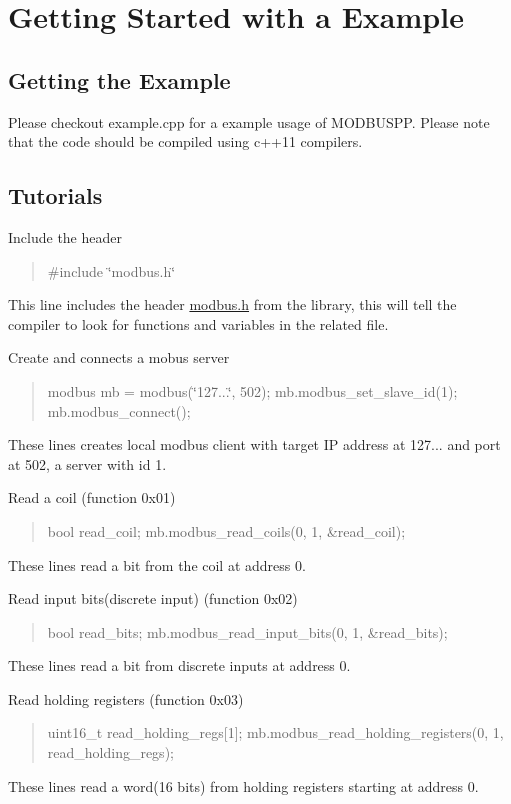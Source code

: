 \section*{Getting Started with a Example}

\subsection*{Getting the Example}

Please checkout example.\+cpp for a example usage of M\+O\+D\+B\+U\+S\+PP. Please note that the code should be compiled using c++11 compilers. \subsection*{Tutorials}

Include the header \begin{quote}
\#include \char`\"{}modbus.\+h\char`\"{} \end{quote}
This line includes the header \mbox{\hyperlink{modbus_8h_source}{modbus.\+h}} from the library, this will tell the compiler to look for functions and variables in the related file.

Create and connects a mobus server \begin{quote}
modbus mb = modbus(\char`\"{}127...\char`\"{}, 502); mb.\+modbus\+\_\+set\+\_\+slave\+\_\+id(1); mb.\+modbus\+\_\+connect(); \end{quote}
These lines creates local modbus client with target IP address at 127... and port at 502, a server with id 1.

Read a coil (function 0x01) \begin{quote}
bool read\+\_\+coil; mb.\+modbus\+\_\+read\+\_\+coils(0, 1, \&read\+\_\+coil); \end{quote}
These lines read a bit from the coil at address 0.

Read input bits(discrete input) (function 0x02) \begin{quote}
bool read\+\_\+bits; mb.\+modbus\+\_\+read\+\_\+input\+\_\+bits(0, 1, \&read\+\_\+bits); \end{quote}
These lines read a bit from discrete inputs at address 0.

Read holding registers (function 0x03) \begin{quote}
uint16\+\_\+t read\+\_\+holding\+\_\+regs\mbox{[}1\mbox{]}; mb.\+modbus\+\_\+read\+\_\+holding\+\_\+registers(0, 1, read\+\_\+holding\+\_\+regs); \end{quote}
These lines read a word(16 bits) from holding registers starting at address 0.

